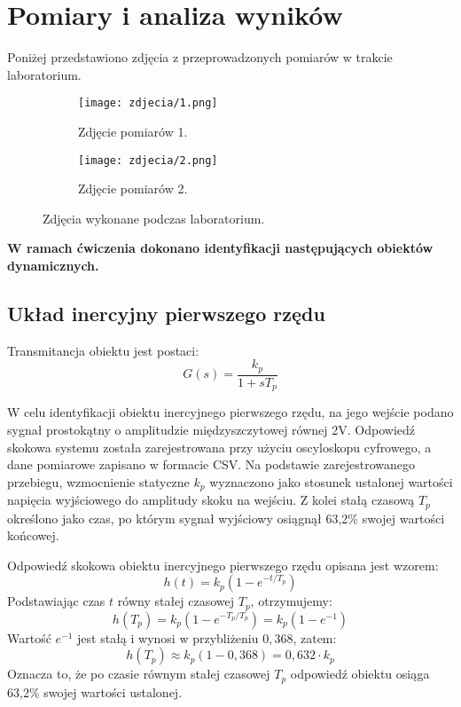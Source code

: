 \documentclass[12pt,a4paper]{article}
\begin{document}
	\section{Pomiary i analiza wyników}
	Poniżej przedstawiono zdjęcia z przeprowadzonych pomiarów w trakcie laboratorium.
	
	\begin{figure}[H]
		\centering
		\begin{subfigure}[b]{0.48\textwidth}
			\centering
			\texttt{[image: zdjecia/1.png]}
			\caption{Zdjęcie pomiarów 1.}
			\label{fig:pomiar1}
		\end{subfigure}
		\hfill
		\begin{subfigure}[b]{0.48\textwidth}
			\centering
			\texttt{[image: zdjecia/2.png]}
			\caption{Zdjęcie pomiarów 2.}
			\label{fig:pomiar2}
		\end{subfigure}
		\caption{Zdjęcia wykonane podczas laboratorium.}
	\end{figure}
	
	\textbf{W ramach ćwiczenia dokonano identyfikacji następujących obiektów dynamicznych.}
	
	\subsection{Układ inercyjny pierwszego rzędu}
	Transmitancja obiektu jest postaci:
	\begin{equation}
		G(s) = \frac{k_p}{1 + sT_p}
	\end{equation}
	
	W celu identyfikacji obiektu inercyjnego pierwszego rzędu, na jego wejście podano sygnał prostokątny o amplitudzie międzyszczytowej równej 2V. Odpowiedź skokowa systemu została zarejestrowana przy użyciu oscyloskopu cyfrowego, a dane pomiarowe zapisano w formacie CSV. Na podstawie zarejestrowanego przebiegu, wzmocnienie statyczne $k_p$ wyznaczono jako stosunek ustalonej wartości napięcia wyjściowego do amplitudy skoku na wejściu. Z kolei stałą czasową $T_p$ określono jako czas, po którym sygnał wyjściowy osiągnął 63,2\% swojej wartości końcowej.

	Odpowiedź skokowa obiektu inercyjnego pierwszego rzędu opisana jest wzorem:
	\begin{equation}
		h(t) = k_p(1-e^{-t/T_p})
	\end{equation}
	Podstawiając czas $t$ równy stałej czasowej $T_p$, otrzymujemy:
	\begin{equation}
		h(T_p) = k_p(1-e^{-T_p/T_p}) = k_p(1-e^{-1})
	\end{equation}
	Wartość $e^{-1}$ jest stałą i wynosi w przybliżeniu $0{,}368$, zatem:
	\begin{equation}
		h(T_p) \approx k_p(1-0{,}368) = 0{,}632 \cdot k_p
	\end{equation}
	Oznacza to, że po czasie równym stałej czasowej $T_p$ odpowiedź obiektu osiąga 63,2\% swojej wartości ustalonej.
	
\end{document}

